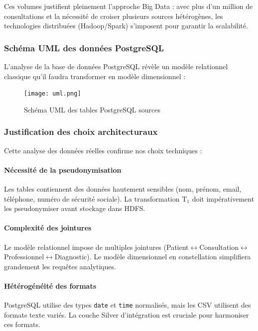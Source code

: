 \documentclass[12pt,a4paper]{article}
\begin{document}
Ces volumes justifient pleinement l'approche Big Data : avec plus d'un million de consultations et la nécessité de croiser plusieurs sources hétérogènes, les technologies distribuées (Hadoop/Spark) s'imposent pour garantir la scalabilité.

\subsubsection{Schéma UML des données PostgreSQL}

L'analyse de la base de données PostgreSQL révèle un modèle relationnel classique qu'il faudra transformer en modèle dimensionnel :

\begin{figure}[H]
\centering
\texttt{[image: uml.png]}
\caption{Schéma UML des tables PostgreSQL sources}
\label{fig:uml_postgresql}
\end{figure}

\subsubsection{Justification des choix architecturaux}

Cette analyse des données réelles confirme nos choix techniques :

\paragraph{Nécessité de la pseudonymisation}
Les tables contiennent des données hautement sensibles (nom, prénom, email, téléphone, numéro de sécurité sociale). La transformation T$_{1}$ doit impérativement les pseudonymiser avant stockage dans HDFS.

\paragraph{Complexité des jointures}
Le modèle relationnel impose de multiples jointures (Patient$\leftrightarrow$Consultation$\leftrightarrow$Professionnel$\leftrightarrow$Diagnostic). Le modèle dimensionnel en constellation simplifiera grandement les requêtes analytiques.

\paragraph{Hétérogénéité des formats}
PostgreSQL utilise des types \texttt{date} et \texttt{time} normalisés, mais les CSV utilisent des formats texte variés. La couche Silver d'intégration est cruciale pour harmoniser ces formats.
\end{document}

